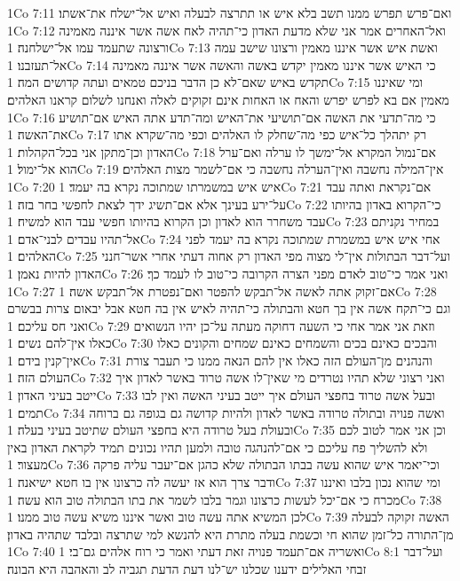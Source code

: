 1Co 7:11  ואם־פרש תפרש ממנו תשב בלא איש או תתרצה לבעלה ואיש אל־ישלח את־אשתו׃
1Co 7:12  ואל־האחרים אמר אני שלא מדעת האדון כי־תהיה לאח אשה אשר איננה מאמינה ורצונה שתעמד עמו אל־ישלחנה׃
1Co 7:13  ואשת איש אשר איננו מאמין ורצונו שישב עמה אל־תעזבנו׃
1Co 7:14  כי האיש אשר איננו מאמין יקדש באשה והאשה אשר איננה מאמינה תקדש באיש שאם־לא כן הדבר בניכם טמאים ועתה קדושים המה׃
1Co 7:15  ומי שאיננו מאמין אם בא לפרש יפרש והאח או האחות אינם זקוקים לאלה ואנחנו לשלום קראנו האלהים׃
1Co 7:16  כי מה־תדעי את האשה אם־תושיעי את־האיש ומה־תדע אתה האיש אם־תושיע את־האשה׃
1Co 7:17  רק יתהלך כל־איש כפי מה־שחלק לו האלהים וכפי מה־שקרא אתו האדון וכן־מתקן אני בכל־הקהלות׃
1Co 7:18  אם־נמול המקרא אל־ימשך לו ערלה ואם־ערל הוא אל־ימול׃
1Co 7:19  אין־המילה נחשבה ואין־הערלה נחשבה כי אם־לשמר מצות האלהים׃
1Co 7:20  איש איש במשמרתו שמתוכה נקרא בה יעמד׃
1Co 7:21  אם־נקראת ואתה עבד על־ירע בעינך אלא אם־תשיג ידך לצאת לחפשי בחר בזה׃
1Co 7:22  כי־הקרוא באדון בהיותו עבד משחרר הוא לאדון וכן הקרוא בהיותו חפשי עבד הוא למשיח׃
1Co 7:23  במחיר נקניתם אל־תהיו עבדים לבני־אדם׃
1Co 7:24  אחי איש איש במשמרת שמתוכה נקרא בה יעמד לפני האלהים׃
1Co 7:25  ועל־דבר הבתולות אין־לי מצוה מפי האדון רק אחוה דעתי אחרי אשר־חנני האדון להיות נאמן׃
1Co 7:26  ואני אמר כי־טוב לאדם מפני הצרה הקרובה כי־טוב לו לעמד כך׃
1Co 7:27  אם־זקוק אתה לאשה אל־תבקש להפטר ואם־נפטרת אל־תבקש אשה׃
1Co 7:28  וגם כי־תקח אשה אין בך חטא והבתולה כי־תהיה לאיש אין בה חטא אבל יבאום צרות בבשרם ואני חס עליכם׃
1Co 7:29  וזאת אני אמר אחי כי השעה דחוקה מעתה על־כן יהיו הנשואים כאלו אין־להם נשים׃
1Co 7:30  והבכים כאינם בכים והשמחים כאינם שמחים והקונים כאלו אין־קנין בידם׃
1Co 7:31  והנהנים מן־העולם הזה כאלו אין להם הנאה ממנו כי תעבר צורת העולם הזה׃
1Co 7:32  ואני רצוני שלא תהיו נטרדים מי שאין־לו אשה טרוד באשר לאדון איך ייטב בעיני האדון׃
1Co 7:33  ובעל אשה טרוד בחפצי העולם איך ייטב בעיני האשה ואין לבו תמים׃
1Co 7:34  ואשה פנויה ובתולה טרודה באשר לאדון ולהיות קדושה גם בגופה גם ברוחה ובעולת בעל טרודה היא בחפצי העולם שתיטב בעיני בעלה׃
1Co 7:35  וכן אני אמר לטוב לכם ולא להשליך פח עליכם כי אם־להנהגה טובה ולמען תהיו נכונים תמיד לקראת האדון באין מעצור׃
1Co 7:36  וכי־יאמר איש שהוא עשה בבתו הבתולה שלא כהגן אם־יעבר עליה פרקה ודבר צרך הוא אז יעשה לה כרצונו אין בו חטא ישיאנה׃
1Co 7:37  ומי שהוא נכון בלבו ואיננו מכרח כי אם־יכל לעשות כרצונו וגמר בלבו לשמר את בתו הבתולה טוב הוא עשה׃
1Co 7:38  לכן המשיא אתה עשה טוב ואשר איננו משיא עשה טוב ממנו׃
1Co 7:39  האשה זקוקה לבעלה מן־התורה כל־זמן שהוא חי וכשמת בעלה מתרת היא להנשא למי שתרצה ובלבד שתהיה באדון׃
1Co 7:40  ואשריה אם־תעמד פנויה זאת דעתי ואמר כי רוח אלהים גם־בי׃
1Co 8:1  ועל־דבר זבחי האלילים ידענו שכלנו יש־לנו דעת הדעת תגביה לב והאהבה היא הבונה׃
